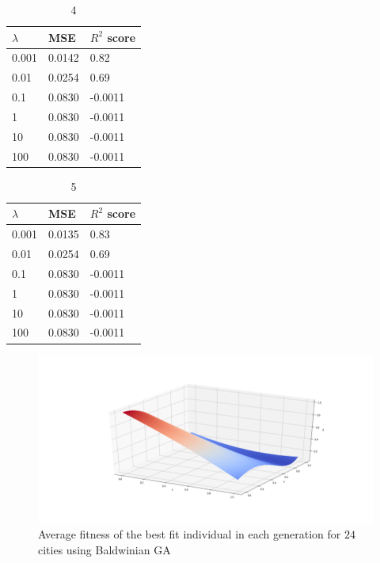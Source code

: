 \documentclass [11pt]{article}
\begin{document}
\begin{table}[]
\centering
\begin{tabular}{lll}
\hline
$\lambda$ & MSE    & $R^{2}$ score \\ \hline
0.001     & 0.0142 & 0.82          \\
0.01      & 0.0254 & 0.69          \\
0.1       & 0.0830 & -0.0011       \\
1         & 0.0830 & -0.0011       \\
10        & 0.0830 & -0.0011       \\
100       & 0.0830 & -0.0011       \\ \hline
\end{tabular}
\caption{4}
\label{tab:LassoFranke4}
\end{table}

\begin{table}[]
\centering
\begin{tabular}{lll}
\hline
$\lambda$ & MSE    & $R^{2}$ score \\ \hline
0.001     & 0.0135 & 0.83          \\
0.01      & 0.0254 & 0.69          \\
0.1       & 0.0830 & -0.0011       \\
1         & 0.0830 & -0.0011       \\
10        & 0.0830 & -0.0011       \\
100       & 0.0830 & -0.0011       \\ \hline
\end{tabular}
\caption{5}
\label{tab:LassoFranke5}
\end{table}

\begin{figure}[H]
\centering
\includegraphics[width=1\textwidth]{figures/LassoFranke.png}
        \caption{Average fitness of the best fit individual in each generation for $24$ cities using Baldwinian GA}
        \label{fig:LassoFranke}
\end{figure}
\end{document}
